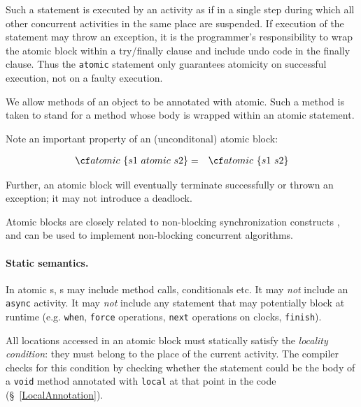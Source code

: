 Such a statement is executed by an activity as if in a single step
during which all other concurrent activities in the same place are
suspended. If execution of the statement may throw an exception, it is
the programmer's responsibility to wrap the atomic block within a
{\cf try/finally} clause and include undo code in the finally
clause. Thus the {\tt atomic} statement only guarantees atomicity on
successful execution, not on a faulty execution.

We allow methods of an object to be annotated with {\cf atomic}. Such
a method is taken to stand for a method whose body is wrapped within an
{\cf atomic} statement.

Note an important property of an (unconditonal) atomic block:

\begin{eqnarray}
 {\cf atomic\ \{s1\ atomic\ s2\}} &=& {\cf atomic\ \{s1\ s2\}}
\end{eqnarray}

Further, an atomic block will eventually terminate successfully or
thrown an exception; it may not introduce a deadlock.

Atomic blocks are closely related to non-blocking synchronization
constructs \cite{herlihy91waitfree}, and can be used to implement 
non-blocking concurrent algorithms.

\paragraph{Static semantics.}
In {\cf atomic s}, {\cf s} may include method calls, conditionals etc.
It may {\em not} include an {\tt async} activity.
It may {\em not} include any statement that may potentially block at
runtime (e.g.{} {\tt when}, {\tt force} operations, {\tt next}
operations on clocks, {\tt finish}).

All locations accessed in an atomic block must statically satisfy the
{\em locality condition}: they must belong to the place of the current
activity.\label{LocalityCondition} The
compiler checks for this condition by checking whether the statement
could be the body of a {\tt void} method annotated with {\tt local} at
that point in the code (\S~\ref{LocalAnnotation}).

